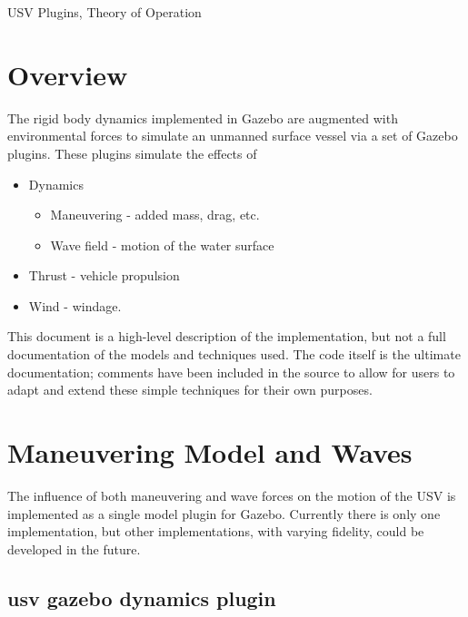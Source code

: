 \documentclass[11pt]{article}
\newcommand{\doctitle}{USV Plugins, Theory of Operation}
\begin{document}
  

\newpage
\setcounter{page}{1}
\begin{center}
{\huge \doctitle}
\end{center}


\section{Overview}
The rigid body dynamics implemented in Gazebo are augmented with environmental forces to simulate an unmanned surface vessel via a set of Gazebo plugins.  These plugins simulate the effects of
\begin{itemize}
\item Dynamics
  \begin{itemize}
  \item Maneuvering - added mass, drag, etc.
  \item Wave field - motion of the water surface
  \end{itemize}
\item Thrust - vehicle propulsion
\item Wind - windage.
  \end{itemize}

This document is a high-level description of the implementation, but not a full documentation of the models and techniques used.  The code itself is the ultimate documentation; comments have been included in the source to allow for users to adapt and extend these simple techniques for their own purposes.

\section{Maneuvering Model and Waves}
The influence of both maneuvering and wave forces on the motion of the USV is implemented as a single model plugin for Gazebo.  Currently there is only one implementation, but other implementations, with varying fidelity, could be developed in the future.

\subsection{usv gazebo dynamics plugin}
\end{document}
